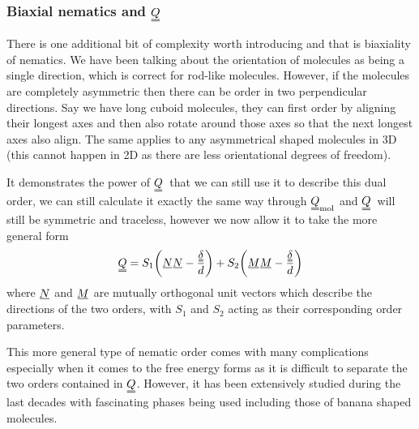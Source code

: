 \documentclass[12pt]{article}
\newcommand{\suf}[2]{\stackunder[0.5pt]{\stackunder[1pt]{\ensuremath{#1}}{\rule{\widthof{\ensuremath{#2}}*\real{0.9}}{.1ex}}}{}}
\newcommand{\duf}[2]{\stackunder[0.5pt]{\stackunder[0.8pt]{\stackunder[1pt]{\ensuremath{#1}}{\rule{\widthof{\ensuremath{#2}}*\real{0.9}}{.1ex}}}{\rule{\widthof{\ensuremath{#2}}*\real{0.9}}{.1ex}}}{}}
\newcommand{\su}[1]{\suf{#1}{#1}}
\newcommand{\du}[1]{\duf{#1}{#1}}
\newcommand{\QQ}{\ensuremath{\du{Q}}}
\newcommand{\dudelta}{\ensuremath{\du{\delta}}}
\begin{document}
        \subsubsection{Biaxial nematics and \QQ}\label{sec:intro_Q_biax}
        There is one additional bit of complexity worth introducing and that is biaxiality of nematics.
        We have been talking about the orientation of molecules as being a single direction, which is correct for rod-like molecules.
        However, if the molecules are completely asymmetric then there can be order in two perpendicular directions.
        Say we have long cuboid molecules, they can first order by aligning their longest axes and then also rotate around those axes so that the next longest axes also align.
        The same applies to any asymmetrical shaped molecules in 3D (this cannot happen in 2D as there are less orientational degrees of freedom).

        It demonstrates the power of \QQ\ that we can still use it to describe this dual order, we can still calculate it exactly the same way through $\du{Q}_\text{mol}$ and \QQ\ will still be symmetric and traceless, however we now allow it to take the more general form
        \begin{equation}\label{eq:Qbiax}
            \du{Q} = S_1\qty(\su{N} \su{N} - \frac{\dudelta}{d}) + S_2\qty(\su{M} \su{M} - \frac{\dudelta}{d})
        \end{equation}
        where $\su{N}$ and $\su{M}$ are mutually orthogonal unit vectors which describe the directions of the two orders, with $S_1$ and $S_2$ acting as their corresponding order parameters.

        This more general type of nematic order comes with many complications especially when it comes to the free energy forms as it is difficult to separate the two orders contained in \QQ.
        However, it has been extensively studied during the last decades with fascinating phases being used including those of banana shaped molecules\cite{luckhurstBiaxialNematicLiquid2015,kumarBiaxialityNematicSmectic2017,kimCurvaturesSmecticLiquid2018}.

\end{document}
